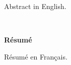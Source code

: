 Abstract in English.

\cleardoublepage

\newpage
{}
\hbox{ }
\twoinmar
{}
\centerline{\large\bf R\'esum\'e}
\vspace{0.7in}
\onehalfspacing

Résumé en Français.


